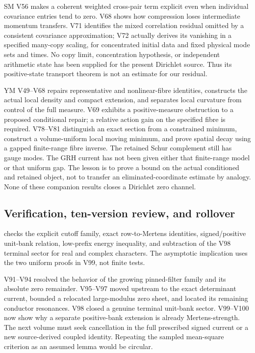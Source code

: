 \documentclass[11pt]{article}
\theoremstyle{definition}
\theoremstyle{remark}
\begin{document}
SM V56 makes a coherent weighted cross-pair term explicit even when
individual covariance entries tend to zero.  V68 shows how compression
loses intermediate momentum transfers.  V71 identifies the mixed
correlation residual omitted by a consistent covariance approximation;
V72 actually derives its vanishing in a specified many-copy scaling,
for concentrated initial data and fixed physical mode sets and times.
No copy limit, concentration hypothesis, or independent arithmetic
state has been supplied for the present Dirichlet source.  Thus its
positive-state transport theorem is not an estimate for our residual.

YM V49--V68 repairs representative and nonlinear-fibre identities,
constructs the actual local density and compact extension, and separates
local curvature from control of the full measure.  V69 exhibits a
positive-measure obstruction to a proposed conditional repair; a
relative action gain on the specified fibre is required.  V78--V81
distinguish an exact section from a constrained minimum, construct a
volume-uniform local moving minimum, and prove spatial decay using a
gapped finite-range fibre inverse.  The retained Schur complement still
has gauge modes.  The GRH current has not been given either that
finite-range model or that uniform gap.  The lesson is to prove a
bound on the actual conditioned and retained object, not to transfer
an eliminated-coordinate estimate by analogy.  None of these companion
results closes a Dirichlet zero channel.

\subsection*{Verification, ten-version review, and rollover}

 checks the explicit
cutoff family, exact row-to-Mertens identities, signed/positive unit-bank
relation, low-prefix energy inequality, and subtraction of the V98
terminal sector for real and complex characters.  The asymptotic
implication uses the two uniform proofs in V99, not finite tests.

V91--V94 resolved the behavior of the growing pinned-filter family
and its absolute zero remainder.  V95--V97 moved upstream to the exact
determinant current, bounded a relocated large-modulus zero sheet, and
located its remaining conductor resonances.  V98 closed a genuine
terminal unit-bank sector.  V99--V100 now show why a separate
positive-bank extension is already Mertens-strength.  The next volume
must seek cancellation in the full prescribed signed current or a
new source-derived coupled identity.  Repeating the sampled mean-square
criterion as an assumed lemma would be circular.
\end{document}
